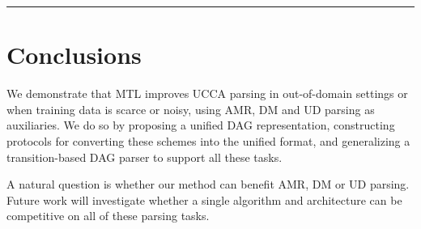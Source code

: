 \documentclass[a0,portrait]{a0poster}
\begin{document}
\begin{multicols}{2}
\hrule


\section*{Conclusions}

We demonstrate that MTL improves UCCA parsing in out-of-domain settings
or when training data is scarce or noisy,
using AMR, DM and UD parsing as auxiliaries.
We do so by proposing a unified DAG representation,
constructing protocols for converting these schemes into the unified format,
and generalizing a transition-based DAG parser to support all these tasks.

A natural question is whether our method can benefit AMR, DM or UD parsing.
Future work will investigate whether a single
algorithm and architecture can be competitive on all of these parsing tasks.

\color{DarkSlateGray}
\tiny



\end{multicols}
\end{document}
